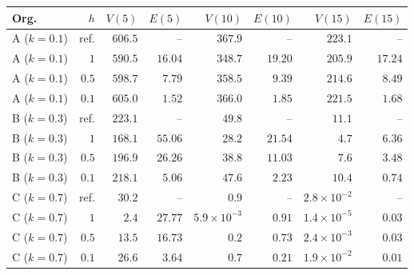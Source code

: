\begin{tabular}{lrrrrrrr}
\toprule
Org. & $h$ & $V(5)$ & $E(5)$ & $V(10)$ & $E(10)$ & $V(15)$ & $E(15)$ \\
\midrule
A ($k = 0.1$) & ref. & $606.5$ & -- & $367.9$ & -- & $223.1$ & -- \\
A ($k = 0.1$) & $1$ & $590.5$ & $16.04$ & $348.7$ & $19.20$ & $205.9$ & $17.24$ \\
A ($k = 0.1$) & $0.5$ & $598.7$ & $7.79$ & $358.5$ & $9.39$ & $214.6$ & $8.49$ \\
A ($k = 0.1$) & $0.1$ & $605.0$ & $1.52$ & $366.0$ & $1.85$ & $221.5$ & $1.68$ \\
B ($k = 0.3$) & ref. & $223.1$ & -- & $49.8$ & -- & $11.1$ & -- \\
B ($k = 0.3$) & $1$ & $168.1$ & $55.06$ & $28.2$ & $21.54$ & $4.7$ & $6.36$ \\
B ($k = 0.3$) & $0.5$ & $196.9$ & $26.26$ & $38.8$ & $11.03$ & $7.6$ & $3.48$ \\
B ($k = 0.3$) & $0.1$ & $218.1$ & $5.06$ & $47.6$ & $2.23$ & $10.4$ & $0.74$ \\
C ($k = 0.7$) & ref. & $30.2$ & -- & $0.9$ & -- & $2.8 \times 10^{-2}$ & -- \\
C ($k = 0.7$) & $1$ & $2.4$ & $27.77$ & $5.9 \times 10^{-3}$ & $0.91$ & $1.4 \times 10^{-5}$ & $0.03$ \\
C ($k = 0.7$) & $0.5$ & $13.5$ & $16.73$ & $0.2$ & $0.73$ & $2.4 \times 10^{-3}$ & $0.03$ \\
C ($k = 0.7$) & $0.1$ & $26.6$ & $3.64$ & $0.7$ & $0.21$ & $1.9 \times 10^{-2}$ & $0.01$ \\
\bottomrule
\end{tabular}
